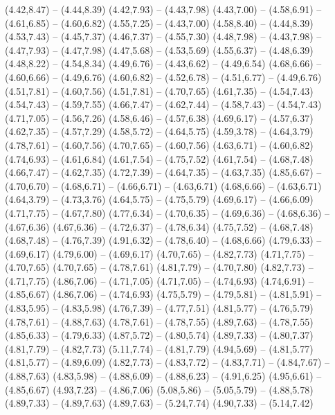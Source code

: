 {  (4.42,8.47) -- (4.44,8.39)
  (4.42,7.93) -- (4.43,7.98)
  (4.43,7.00) -- (4.58,6.91) -- (4.61,6.85) -- (4.60,6.82)
  (4.55,7.25) -- (4.43,7.00)
  (4.58,8.40) -- (4.44,8.39)
  (4.53,7.43) -- (4.45,7.37)
  (4.46,7.37) -- (4.55,7.30)
  (4.48,7.98) -- (4.43,7.98) -- (4.47,7.93) -- (4.47,7.98)
  (4.47,5.68) -- (4.53,5.69)
  (4.55,6.37) -- (4.48,6.39)
  (4.48,8.22) -- (4.54,8.34)
  (4.49,6.76) -- (4.43,6.62) -- (4.49,6.54)
  (4.68,6.66) -- (4.60,6.66) -- (4.49,6.76)
  (4.60,6.82) -- (4.52,6.78) -- (4.51,6.77) -- (4.49,6.76)
  (4.51,7.81) -- (4.60,7.56)
  (4.51,7.81) -- (4.70,7.65)
  (4.61,7.35) -- (4.54,7.43)
  (4.54,7.43) -- (4.59,7.55)
  (4.66,7.47) -- (4.62,7.44) -- (4.58,7.43) -- (4.54,7.43)
  (4.71,7.05) -- (4.56,7.26)
  (4.58,6.46) -- (4.57,6.38)
  (4.69,6.17) -- (4.57,6.37)
  (4.62,7.35) -- (4.57,7.29)
  (4.58,5.72) -- (4.64,5.75)
  (4.59,3.78) -- (4.64,3.79)
  (4.78,7.61) -- (4.60,7.56)
  (4.70,7.65) -- (4.60,7.56)
  (4.63,6.71) -- (4.60,6.82)
  (4.74,6.93) -- (4.61,6.84)
  (4.61,7.54) -- (4.75,7.52)
  (4.61,7.54) -- (4.68,7.48)
  (4.66,7.47) -- (4.62,7.35)
  (4.72,7.39) -- (4.64,7.35) -- (4.63,7.35)
  (4.85,6.67) -- (4.70,6.70) -- (4.68,6.71) -- (4.66,6.71) -- (4.63,6.71)
  (4.68,6.66) -- (4.63,6.71)
  (4.64,3.79) -- (4.73,3.76)
  (4.64,5.75) -- (4.75,5.79)
  (4.69,6.17) -- (4.66,6.09)
  (4.71,7.75) -- (4.67,7.80)
  (4.77,6.34) -- (4.70,6.35) -- (4.69,6.36) -- (4.68,6.36) -- (4.67,6.36)
  (4.67,6.36) -- (4.72,6.37) -- (4.78,6.34)
  (4.75,7.52) -- (4.68,7.48)
  (4.68,7.48) -- (4.76,7.39)
  (4.91,6.32) -- (4.78,6.40) -- (4.68,6.66)
  (4.79,6.33) -- (4.69,6.17)
  (4.79,6.00) -- (4.69,6.17)
  (4.70,7.65) -- (4.82,7.73)
  (4.71,7.75) -- (4.70,7.65)
  (4.70,7.65) -- (4.78,7.61)
  (4.81,7.79) -- (4.70,7.80)
  (4.82,7.73) -- (4.71,7.75)
  (4.86,7.06) -- (4.71,7.05)
  (4.71,7.05) -- (4.74,6.93)
  (4.74,6.91) -- (4.85,6.67)
  (4.86,7.06) -- (4.74,6.93)
  (4.75,5.79) -- (4.79,5.81) -- (4.81,5.91) -- (4.83,5.95) -- (4.83,5.98)
  (4.76,7.39) -- (4.77,7.51)
  (4.81,5.77) -- (4.76,5.79)
  (4.78,7.61) -- (4.88,7.63)
  (4.78,7.61) -- (4.78,7.55)
  (4.89,7.63) -- (4.78,7.55)
  (4.85,6.33) -- (4.79,6.33)
  (4.87,5.72) -- (4.80,5.74)
  (4.89,7.33) -- (4.80,7.37)
  (4.81,7.79) -- (4.82,7.73)
  (5.11,7.74) -- (4.81,7.79)
  (4.94,5.69) -- (4.81,5.77)
  (4.81,5.77) -- (4.89,6.09)
  (4.82,7.73) -- (4.83,7.72) -- (4.83,7.71) -- (4.84,7.67) -- (4.88,7.63)
  (4.83,5.98) -- (4.88,6.09) -- (4.88,6.23) -- (4.91,6.25)
  (4.95,6.61) -- (4.85,6.67)
  (4.93,7.23) -- (4.86,7.06)
  (5.08,5.86) -- (5.05,5.79) -- (4.88,5.78)
  (4.89,7.33) -- (4.89,7.63)
  (4.89,7.63) -- (5.24,7.74)
  (4.90,7.33) -- (5.14,7.42)
}
